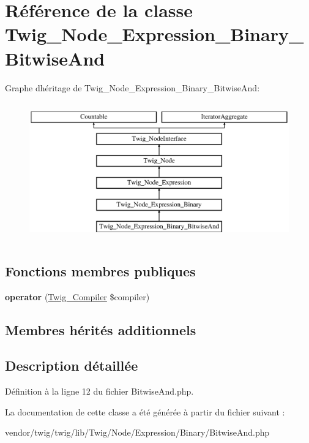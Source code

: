 \hypertarget{class_twig___node___expression___binary___bitwise_and}{}\section{Référence de la classe Twig\+\_\+\+Node\+\_\+\+Expression\+\_\+\+Binary\+\_\+\+Bitwise\+And}
\label{class_twig___node___expression___binary___bitwise_and}
Graphe d\textquotesingle{}héritage de Twig\+\_\+\+Node\+\_\+\+Expression\+\_\+\+Binary\+\_\+\+Bitwise\+And\+:\begin{figure}[H]
\begin{center}
\leavevmode
\includegraphics[height=6.000000cm]{class_twig___node___expression___binary___bitwise_and}
\end{center}
\end{figure}
\subsection*{Fonctions membres publiques}
\begin{DoxyCompactItemize}
\item 
{\bfseries operator} (\hyperlink{class_twig___compiler}{Twig\+\_\+\+Compiler} \$compiler)\hypertarget{class_twig___node___expression___binary___bitwise_and_af77318ec88d5f8a508684970a150b670}{}\label{class_twig___node___expression___binary___bitwise_and_af77318ec88d5f8a508684970a150b670}

\end{DoxyCompactItemize}
\subsection*{Membres hérités additionnels}


\subsection{Description détaillée}


Définition à la ligne 12 du fichier Bitwise\+And.\+php.



La documentation de cette classe a été générée à partir du fichier suivant \+:\begin{DoxyCompactItemize}
\item 
vendor/twig/twig/lib/\+Twig/\+Node/\+Expression/\+Binary/Bitwise\+And.\+php\end{DoxyCompactItemize}
